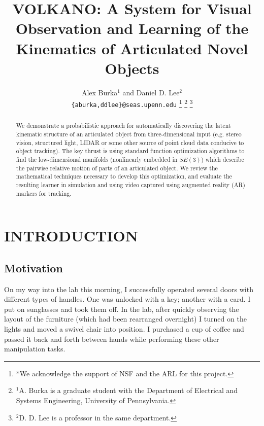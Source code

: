\documentclass[letterpaper, 10 pt, conference]{ieeeconf}  %
\title{\LARGE \bf
VOLKANO: A System for Visual Observation and Learning of the Kinematics of Articulated Novel Objects
}
\author{Alex Burka$^{1}$ and Daniel D. Lee$^{2}$ \\ {\tt\small\{aburka,ddlee\}@seas.upenn.edu}
\thanks{*We acknowledge the support of NSF and the ARL for this project.}%
\thanks{$^{1}$A. Burka is a graduate student with the Department of Electrical and Systems Engineering, University of Pennsylvania.}%
\thanks{$^{2}$D. D. Lee is a professor in the same department.}%
}
\begin{document}
\maketitle
\thispagestyle{empty}
\pagestyle{empty}


\begin{abstract}

  We demonstrate a probabilistic approach for automatically discovering the latent kinematic structure of an articulated object from three-dimensional input (e.g. stereo vision, structured light, LIDAR or some other source of point cloud data conducive to object tracking).  The key thrust is using standard function optimization algorithms to find the low-dimensional manifolds (nonlinearly embedded in $SE(3)$) which describe the pairwise relative motion of parts of an articulated object. We review the mathematical techniques necessary to develop this optimization, and evaluate the resulting learner in simulation and using video captured using augmented reality (AR) markers for tracking.

\end{abstract}


\section{INTRODUCTION}

\subsection{Motivation}
On my way into the lab this morning, I successfully operated several doors with different types of handles. One was unlocked with a key; another with a card. I put on sunglasses and took them off. In the lab, after quickly observing the layout of the furniture (which had been rearranged overnight) I turned on the lights and moved a swivel chair into position. I purchased a cup of coffee and passed it back and forth between hands while performing these other manipulation tasks.
\end{document}
